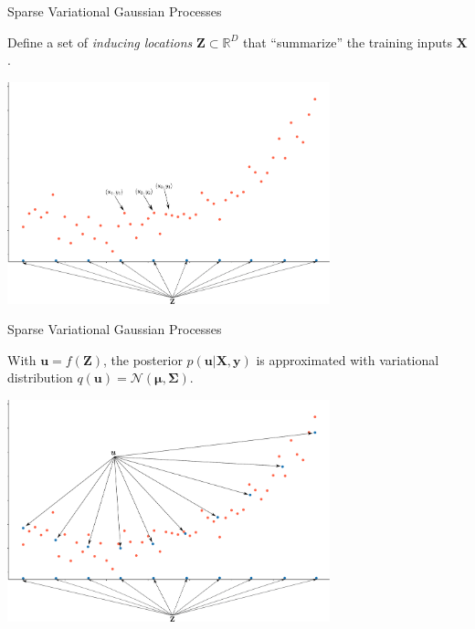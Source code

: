 \documentclass[aspectratio=149]{beamer}
\begin{document}
    \begin{frame}{Sparse Variational Gaussian Processes}
    \begin{center}
    Define a set of \emph{inducing locations} \(\mathbf{Z} \subset \mathbb{R}^D\) that ``summarize'' the training inputs \(\mathbf{X}\). 
    \end{center}

    \begin{center}
        \includegraphics[width=0.7\textwidth]{slides_imgs/GP_inducing_1.pdf}
    \end{center}
    \end{frame}
    \begin{frame}{Sparse Variational Gaussian Processes}
    \begin{center}
    With \(\mathbf{u} = f(\mathbf{Z})\), the posterior \(p(\mathbf{u}|\mathbf{X}, \mathbf{y})\) is approximated with variational distribution \(q(\mathbf{u}) = \mathcal{N}(\bm{\mu}, \bm{\Sigma})\).
    \end{center}

    \begin{center}
        \includegraphics[width=0.7\textwidth]{slides_imgs/GP_inducing_2.pdf}
    \end{center}
    \end{frame}
\end{document}
